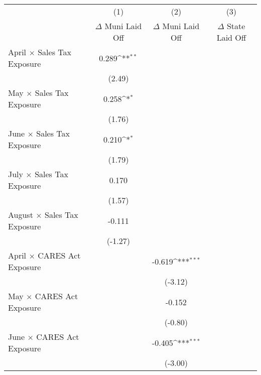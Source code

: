 {
\def\sym#1{\ifmmode^{#1}\else\(^{#1}\)\fi}
\begin{tabular}{l*{3}{c}}
\hline\hline
                    &\multicolumn{1}{c}{(1)}&\multicolumn{1}{c}{(2)}&\multicolumn{1}{c}{(3)}\\
                    &\multicolumn{1}{c}{$\Delta$ Muni Laid Off}&\multicolumn{1}{c}{$\Delta$ Muni Laid Off}&\multicolumn{1}{c}{$\Delta$ State Laid Off}\\
\hline
April $\times$ Sales Tax Exposure&       0.289\sym{**} &                     &                     \\
                    &      (2.49)         &                     &                     \\
[1em]
May $\times$ Sales Tax Exposure&       0.258\sym{*}  &                     &                     \\
                    &      (1.76)         &                     &                     \\
[1em]
June $\times$ Sales Tax Exposure&       0.210\sym{*}  &                     &                     \\
                    &      (1.79)         &                     &                     \\
[1em]
July $\times$ Sales Tax Exposure&       0.170         &                     &                     \\
                    &      (1.57)         &                     &                     \\
[1em]
August $\times$ Sales Tax Exposure&      -0.111         &                     &                     \\
                    &     (-1.27)         &                     &                     \\
[1em]
April $\times$ CARES Act Exposure&                     &      -0.619\sym{***}&                     \\
                    &                     &     (-3.12)         &                     \\
[1em]
May $\times$ CARES Act Exposure&                     &      -0.152         &                     \\
                    &                     &     (-0.80)         &                     \\
[1em]
June $\times$ CARES Act Exposure&                     &      -0.405\sym{***}&                     \\
                    &                     &     (-3.00)         &                     \\

\end{tabular}}
